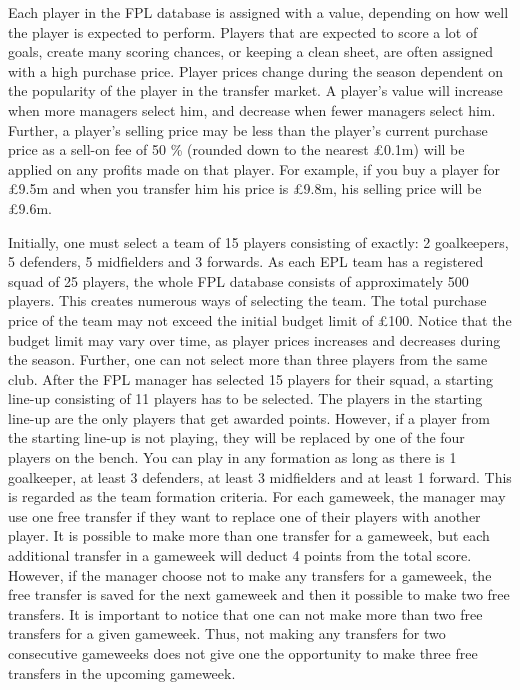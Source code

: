 \newpar

Each player in the FPL database is assigned with a value, depending on how well the player is expected to perform. Players that are expected to score a lot of goals, create many scoring chances, or keeping a clean sheet, are often assigned with a high purchase price. Player prices change during the season dependent on the popularity of the player in the transfer market. A player's value will increase when more managers select him, and decrease when fewer managers select him. Further, a player's selling price may be less than the player's current purchase price as a sell-on fee of 50 \% (rounded down to the nearest \pounds 0.1m) will be applied on any profits made on that player. For example, if you buy a player for \pounds 9.5m and when you transfer him his price is \pounds 9.8m, his selling price will be \pounds 9.6m.

\newpar
Initially, one must select a team of 15 players consisting of exactly: 2 goalkeepers, 5 defenders, 5 midfielders and 3 forwards. As each EPL team has a registered squad of 25 players, the whole FPL database consists of approximately 500 players. This creates numerous ways of selecting the team. The total purchase price of the team may not exceed the initial budget limit of £100. Notice that the budget limit may vary over time, as player prices increases and decreases during the season. Further, one can not select more than three players from the same club. After the FPL manager has selected 15 players for their squad, a starting line-up consisting of 11 players has to be selected. The players in the starting line-up are the only players that get awarded points. However, if a player from the starting line-up is not playing, they will be replaced by one of the four players on the bench. You can play in any formation as long as there is 1 goalkeeper, at least 3 defenders, at least 3 midfielders and at least 1 forward. This is regarded as the team formation criteria.
\newpar
For each gameweek, the manager may use one free transfer if they want to replace one of their players with another player. It is possible to make more than one transfer for a gameweek, but each additional transfer in a gameweek will deduct 4 points from the total score. However, if the manager choose not to make any transfers for a gameweek, the free transfer is saved for the next gameweek and then it possible to make two free transfers. It is important to notice that one can not make more than two free transfers for a given gameweek. Thus, not making any transfers for two consecutive gameweeks does not give one the opportunity to make three free transfers in the upcoming gameweek. 


